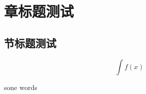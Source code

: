 \documentclass{ctexbook}
\begin{document}
\tableofcontents
{}
    \chapter{章标题测试}
    \section{节标题测试}
    


    \newpage
    \begin{equation}
        \int f(x)
    \end{equation}
    \newpage

    sone words
\end{document}
